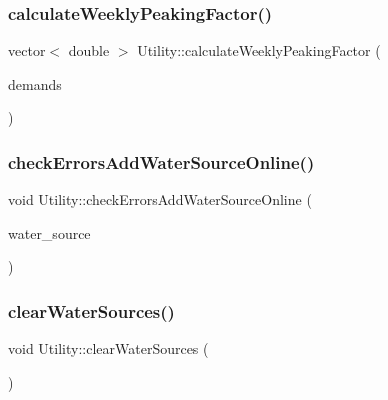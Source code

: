\subsubsection{\texorpdfstring{calculate\+Weekly\+Peaking\+Factor()}{calculateWeeklyPeakingFactor()}}
{\footnotesize\ttfamily vector$<$ double $>$ Utility\+::calculate\+Weekly\+Peaking\+Factor (\begin{DoxyParamCaption}\item[{vector$<$ double $>$ $\ast$}]{demands }\end{DoxyParamCaption})}

\mbox{\label{classUtility_a0674d7d95f4d6595f7e01817a4d84a98_a0674d7d95f4d6595f7e01817a4d84a98}} 
\subsubsection{\texorpdfstring{check\+Errors\+Add\+Water\+Source\+Online()}{checkErrorsAddWaterSourceOnline()}}
{\footnotesize\ttfamily void Utility\+::check\+Errors\+Add\+Water\+Source\+Online (\begin{DoxyParamCaption}\item[{\mbox{\hyperlink{classWaterSource}{Water\+Source}} $\ast$}]{water\+\_\+source }\end{DoxyParamCaption})}

\mbox{\label{classUtility_aa770f28c76e84747bbd643f55dbc4dd5_aa770f28c76e84747bbd643f55dbc4dd5}} 
\subsubsection{\texorpdfstring{clear\+Water\+Sources()}{clearWaterSources()}}
{\footnotesize\ttfamily void Utility\+::clear\+Water\+Sources (\begin{DoxyParamCaption}{ }\end{DoxyParamCaption})}

\mbox{\label{classUtility_a2156ad82d86ed63a22f932a90062ed29_a2156ad82d86ed63a22f932a90062ed29}} 
